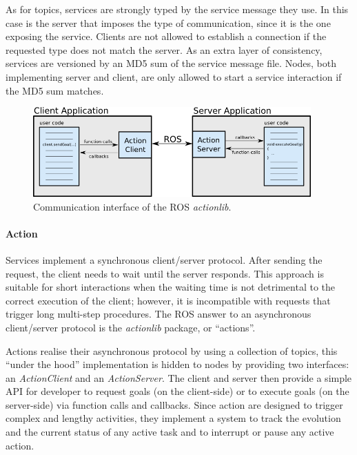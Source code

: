 As for topics, services are strongly typed by the service message they use. In this case is the server that imposes the type of communication, since it is the one exposing the service. Clients are not allowed to establish a connection if the requested type does not match the server. As an extra layer of consistency, services are versioned by an MD5 sum of the service message file. Nodes, both implementing server and client, are only allowed to start a service interaction if the MD5 sum matches.

\begin{figure}[t]
    \centering
    \includegraphics[width=0.95\textwidth]{gfx/ros/action}
    \caption{Communication interface of the ROS \textit{actionlib}.}\label{fig:ros-action}
\end{figure}

\paragraph{Action} Services implement a synchronous client/server protocol. After sending the request, the client needs to wait until the server responds. This approach is suitable for short interactions when the waiting time is not detrimental to the correct execution of the client; however, it is incompatible with requests that trigger long multi-step procedures. The ROS answer to an asynchronous client/server protocol is the \textit{actionlib} package, or ``actions''.

Actions realise their asynchronous protocol by using a collection of topics, this ``under the hood'' implementation is hidden to nodes by providing two interfaces: an \textit{ActionClient} and an \textit{ActionServer}. The client and server then provide a simple API for developer to request goals (on the client-side) or to execute goals (on the server-side) via function calls and callbacks. Since action are designed to trigger complex and lengthy activities, they implement a system to track the evolution and the current status of any active task and to interrupt or pause any active action.

